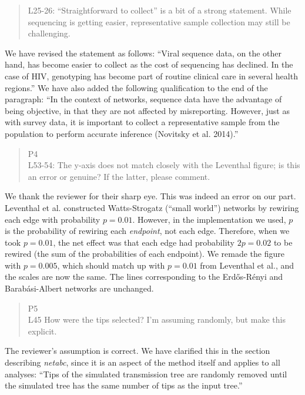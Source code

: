 \documentclass[12pt]{letter}
\begin{document}
\begin{letter}{ }
\begin{quote}
  L25-26: ``Straightforward to collect'' is a bit of a strong statement. While
  sequencing is getting easier, representative sample collection may still be
  challenging.
\end{quote}

We have revised the statement as follows: ``Viral sequence data, on the other
hand, has become easier to collect as the cost of sequencing has declined. In
the case of HIV, genotyping has become part of routine clinical care in several
health regions.'' We have also added the following qualification to the end of
the paragraph: ``In the context of networks, sequence data have the advantage
of being objective, in that they are not affected by misreporting. However,
just as with survey data, it is important to collect a representative sample
from the population to perform accurate inference (Novitsky et al. 2014).''

\begin{quote}
  \itshape

  P4\\
  L53-54: The y-axis does not match closely with the Leventhal figure; is this
  an error or genuine? If the latter, please comment.
\end{quote}

We thank the reviewer for their sharp eye. This was indeed an error on our
part. Leventhal et al. constructed Watts-Strogatz (``small world'') networks by
rewiring each edge with probability $p = 0.01$. However, in the implementation
we used, $p$ is the probability of rewiring each \emph{endpoint}, not each
edge. Therefore, when we took $p = 0.01$, the net effect was that each edge had
probability $2p = 0.02$ to be rewired (the sum of the probabilities of each
endpoint). We remade the figure with $p = 0.005$, which should match up with $p
= 0.01$ from Leventhal et al., and the scales are now the same. The lines
corresponding to the Erd\H{o}s-R\'enyi and Barab\'asi-Albert networks are
unchanged.

\begin{quote}
  \itshape

  P5 \\
  L45 How were the tips selected? I'm assuming randomly, but make this explicit.
\end{quote}

The reviewer's assumption is correct. We have clarified this in the section
describing \textit{netabc}, since it is an aspect of the method itself and
applies to all analyses: ``Tips of the simulated transmission tree are randomly
removed until the simulated tree has the same number of tips as the input
tree.''


\end{letter}
\end{document}
